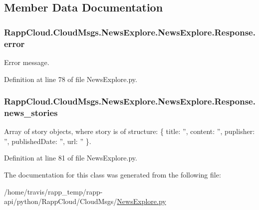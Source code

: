 \subsection{Member Data Documentation}
\hypertarget{classRappCloud_1_1CloudMsgs_1_1NewsExplore_1_1NewsExplore_1_1Response_a2384598da5d38362f49c57bd77f9218b}{
\subsubsection[{error}]{\setlength{\rightskip}{0pt plus 5cm}Rapp\-Cloud.\-Cloud\-Msgs.\-News\-Explore.\-News\-Explore.\-Response.\-error}}\label{classRappCloud_1_1CloudMsgs_1_1NewsExplore_1_1NewsExplore_1_1Response_a2384598da5d38362f49c57bd77f9218b}


Error message. 



Definition at line 78 of file News\-Explore.\-py.

\hypertarget{classRappCloud_1_1CloudMsgs_1_1NewsExplore_1_1NewsExplore_1_1Response_ab55b67a059bc5cbbd136f9b5747a7310}{
\subsubsection[{news\-\_\-stories}]{\setlength{\rightskip}{0pt plus 5cm}Rapp\-Cloud.\-Cloud\-Msgs.\-News\-Explore.\-News\-Explore.\-Response.\-news\-\_\-stories}}\label{classRappCloud_1_1CloudMsgs_1_1NewsExplore_1_1NewsExplore_1_1Response_ab55b67a059bc5cbbd136f9b5747a7310}


Array of story objects, where story is of structure\-: \{ title\-: '', content\-: '', puplisher\-: '', published\-Date\-: '', url\-: '' \}. 



Definition at line 81 of file News\-Explore.\-py.



The documentation for this class was generated from the following file\-:\begin{DoxyCompactItemize}
\item 
/home/travis/rapp\-\_\-temp/rapp-\/api/python/\-Rapp\-Cloud/\-Cloud\-Msgs/\hyperlink{NewsExplore_8py}{News\-Explore.\-py}\end{DoxyCompactItemize}
